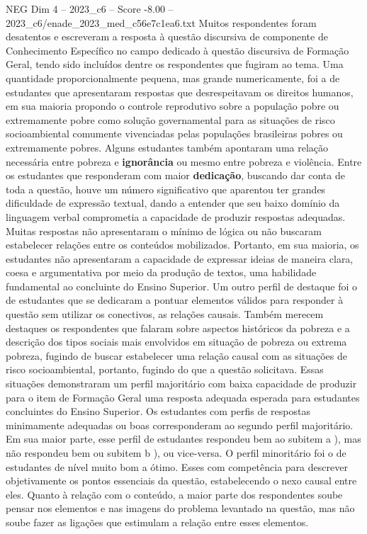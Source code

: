 \begin{textsample}{NEG Dim 4 – 2023\_c6 – Score -8.00 – 2023\_c6/enade\_2023\_med\_c56e7c1ea6.txt}
Muitos respondentes foram desatentos e escreveram a resposta à questão discursiva de componente de Conhecimento Específico no campo dedicado à questão discursiva de Formação Geral, tendo sido incluídos dentre os respondentes que fugiram ao tema.
Uma quantidade proporcionalmente pequena, mas grande numericamente, foi a de estudantes que apresentaram respostas que desrespeitavam os direitos humanos, em sua maioria propondo o controle reprodutivo sobre a população pobre ou extremamente pobre como solução governamental para as situações de risco socioambiental comumente vivenciadas pelas populações brasileiras pobres ou extremamente pobres.
Alguns estudantes também apontaram uma relação necessária entre pobreza e \textbf{ignorância} ou mesmo entre pobreza e violência.
Entre os estudantes que responderam com maior \textbf{dedicação}, buscando dar conta de toda a questão, houve um número significativo que aparentou ter grandes dificuldade de expressão textual, dando a entender que seu baixo domínio da linguagem verbal comprometia a capacidade de produzir respostas adequadas.
Muitas respostas não apresentaram o mínimo de lógica ou não buscaram estabelecer relações entre os conteúdos mobilizados.
Portanto, em sua maioria, os estudantes não apresentaram a capacidade de expressar ideias de maneira clara, coesa e argumentativa por meio da produção de textos, uma habilidade fundamental ao concluinte do Ensino Superior.
Um outro perfil de destaque foi o de estudantes que se dedicaram a pontuar elementos válidos para responder à questão sem utilizar os conectivos, as relações causais.
Também merecem destaques os respondentes que falaram sobre aspectos históricos da pobreza e a descrição dos tipos sociais mais envolvidos em situação de pobreza ou extrema pobreza, fugindo de buscar estabelecer uma relação causal com as situações de risco socioambiental, portanto, fugindo do que a questão solicitava.
Essas situações demonstraram um perfil majoritário com baixa capacidade de produzir para o item de Formação Geral uma resposta adequada esperada para estudantes concluintes do Ensino Superior.
Os estudantes com perfis de respostas minimamente adequadas ou boas corresponderam ao segundo perfil majoritário.
Em sua maior parte, esse perfil de estudantes respondeu bem ao subitem a ), mas não respondeu bem ou subitem b ), ou vice-versa.
O perfil minoritário foi o de estudantes de nível muito bom a ótimo.
Esses com competência para descrever objetivamente os pontos essenciais da questão, estabelecendo o nexo causal entre eles.
Quanto à relação com o conteúdo, a maior parte dos respondentes soube pensar nos elementos e nas imagens do problema levantado na questão, mas não soube fazer as ligações que estimulam a relação entre esses elementos.

\end{textsample}

